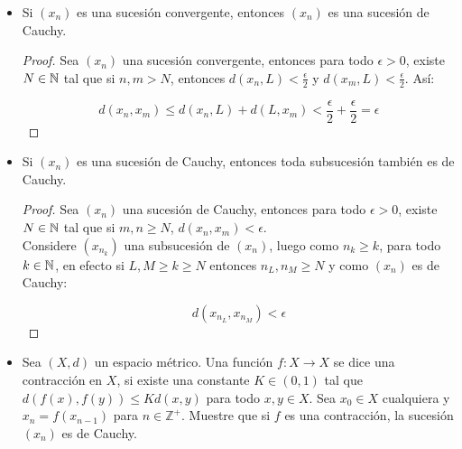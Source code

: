 \begin{itemize}[leftmargin=*]
    \item Si $(x_n)$ es una sucesión convergente, entonces $(x_n)$ es una sucesión de Cauchy.\\

    \begin{proof}
    Sea $(x_n)$ una sucesión convergente, entonces para todo $\epsilon>0$, existe $N\in \mathbb{N}$ tal que si $n,m>N$, entonces $d(x_n,L)<\frac{\epsilon}{2}$ y $d(x_m,L)<\frac{\epsilon}{2}$. Así:

    $$d(x_n,x_m)\leq d(x_n,L)+d(L,x_m)<\frac{\epsilon}{2}+\frac{\epsilon}{2}=\epsilon$$
    \end{proof}

    \item Si $(x_n)$ es una sucesión de Cauchy, entonces toda subsucesión también es de Cauchy.\\

    \begin{proof}
        Sea $(x_n)$ una sucesión de Cauchy, entonces para todo $\epsilon>0$, existe $N\in \mathbb{N}$ tal que si $m,n\geq N$, $d(x_n,x_m)<\epsilon$.\\

        Considere $(x_{n_k})$ una subsucesión de $(x_n)$, luego como $n_k\geq k$, para todo $k\in \mathbb{N}$, en efecto si $L,M\geq k\geq N$ entonces $n_L,n_M\geq N$ y como $(x_n)$ es de Cauchy:

        $$d(x_{n_L},x_{n_M})<\epsilon$$ 
    \end{proof}

    \item Sea $(X,d)$ un espacio métrico. Una función $f:X \longrightarrow X$ se dice una contracción en $X$, si existe una constante $K \in (0,1)$ tal que $d(f(x),f(y))\leq Kd(x,y)$ para todo $x,y \in X$. Sea $x_0 \in X$ cualquiera y $x_n=f(x_{n-1})$ para $n \in \mathbb{Z}^+$. Muestre que si $f$ es una contracción, la sucesión $(x_n)$ es de Cauchy.\\
    

\end{itemize}
